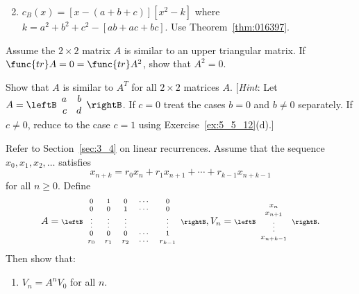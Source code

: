 \begin{multicols}{2}
\begin{ex}
\begin{enumerate}[label={\alph*.}]
\end{enumerate}
\begin{sol}
\begin{enumerate}[label={\alph*.}]
\setcounter{enumi}{1}
\item  $c_{B}(x) = [x - (a + b + c)][x^{2} - k]$ where $k = a^{2} + b^{2} + c^{2} - [ab + ac + bc]$. Use Theorem~\ref{thm:016397}.

\end{enumerate}
\end{sol}
\end{ex}

\begin{ex}
Assume the $2 \times 2$ matrix $A$ is similar to an upper triangular matrix. If $\func{tr} A = 0 = \func{tr} A^{2}$, show that $A^{2} = 0$.
\end{ex}

\begin{ex}
Show that $A$ is similar to $A^{T}$ for all $2 \times 2$ matrices $A$. [\textit{Hint}: Let $A = \leftB \begin{array}{rr}
a & b \\
c & d
\end{array} \rightB$. If $c = 0$ treat the cases $b = 0$ and $b \neq 0$ separately. If $c \neq 0$, reduce to the case $c = 1$ using Exercise~\ref{ex:5_5_12}(d).]
\end{ex}

\begin{ex}
Refer to Section~\ref{sec:3_4} on linear recurrences. Assume that the sequence $x_{0}, x_{1}, x_{2}, \dots$ satisfies
\vspace*{-1em}
\begin{equation*}
x_{n+k} = r_0x_n + r_1x_{n+1} + \dotsb + r_{k-1}x_{n+k-1}
\end{equation*}
for all $n \geq 0$. Define
\begin{equation*}
A = 
\scriptsize \leftB \begin{array}{ccccc}
0 & 1 & 0 & \cdots & 0 \\
0 & 0 & 1 & \cdots & 0 \\
\vdots & \vdots & \vdots & & \vdots \\
0 & 0 & 0 & \cdots & 1 \\
r_0 & r_1 & r_2 & \cdots & r_{k-1}
\end{array} \rightB, V_n =
\leftB \begin{array}{cccc}
x_n \\
x_{n+1} \\
\vdots \\
x_{n+k-1}
\end{array} \rightB.
\end{equation*}
Then show that:
\vspace*{-1em}
\begin{enumerate}[label={\alph*.}]
\item $V_{n} = A^{n}V_{0}$ for all $n$.


\end{enumerate}
\end{ex}
\end{multicols}
